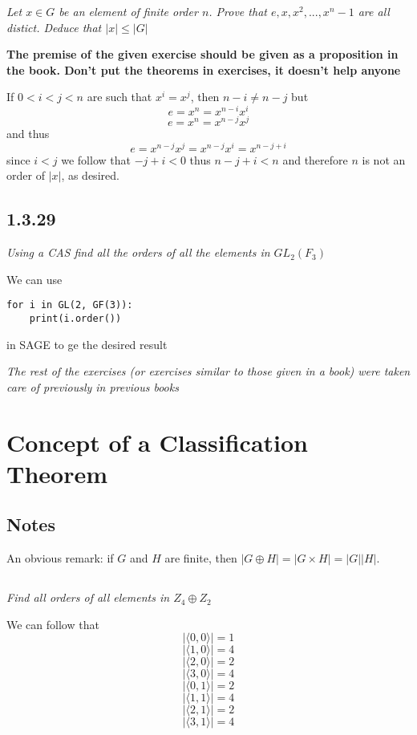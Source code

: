\documentclass[11pt,oneside,titlepage]{book}
\newcommand{\eangle}[1]{\langle #1 \rangle}
\begin{document}
\textit{Let $x \in G$ be an element of finite order $n$. Prove that $e, x, x^2, ..., x^n - 1$
  are all distict. Deduce that $|x| \leq |G|$}

\textbf{The premise of the given exercise should be given as a proposition in the book. Don't
put the theorems in exercises, it doesn't help anyone}

If $0 < i < j < n$ are such that $x^i = x^j$, then $n - i \neq n - j$ but
$$e = x^n = x^{n - i} x^i$$
$$e = x^n = x^{n - j} x^j$$
and thus
$$e = x^{n - j} x^j = x^{n - j} x^i = x^{n - j + i}$$
since $i < j $ we follow that $-j + i < 0$ thus $n - j + i < n$ and therefore $n$ is not
an order of $|x|$, as desired.


\subsection*{1.3.29}

\textit{Using a CAS find all the orders of all the elements in $GL_2(F_3)$}

We can use
\begin{verbatim}
for i in GL(2, GF(3)):
    print(i.order())
\end{verbatim}
in SAGE to ge the desired result

\textit{The rest of the exercises (or exercises similar to those given in a book) were
  taken care of previously in previous books}

\section{Concept of a Classification Theorem}

\subsection*{Notes}

An obvious remark: if $G$ and $H$ are finite, then $|G \oplus H| = |G \times H| = |G||H|$.

\subsection{}

\textit{Find all orders of all elements in $Z_4 \oplus Z_2$}

We can follow that
$$|\eangle{0, 0}| = 1$$
$$|\eangle{1, 0}| = 4$$
$$|\eangle{2, 0}| = 2$$
$$|\eangle{3, 0}| = 4$$
$$|\eangle{0, 1}| = 2$$
$$|\eangle{1, 1}| = 4$$
$$|\eangle{2, 1}| = 2$$
$$|\eangle{3, 1}| = 4$$
\end{document}

